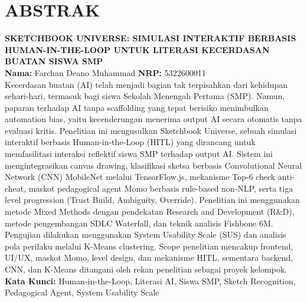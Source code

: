 \documentclass[12pt,a4paper,oneside,openany]{report}
\begin{document}
\chapter*{ABSTRAK}
\thispagestyle{empty}
\textbf{SKETCHBOOK UNIVERSE: SIMULASI INTERAKTIF BERBASIS HUMAN-IN-THE-LOOP UNTUK LITERASI KECERDASAN BUATAN SISWA SMP}\\[0.5cm]
\textbf{Nama:} Farchan Deano Muhammad \quad \textbf{NRP:} 5322600011\\[1cm]
Kecerdasan buatan (AI) telah menjadi bagian tak terpisahkan dari kehidupan sehari-hari, termasuk bagi siswa Sekolah Menengah Pertama (SMP). Namun, paparan terhadap AI tanpa scaffolding yang tepat berisiko menimbulkan automation bias, yaitu kecenderungan menerima output AI secara otomatis tanpa evaluasi kritis. Penelitian ini mengusulkan Sketchbook Universe, sebuah simulasi interaktif berbasis Human-in-the-Loop (HITL) yang dirancang untuk memfasilitasi interaksi reflektif siswa SMP terhadap output AI. Sistem ini mengintegrasikan canvas drawing, klasifikasi sketsa berbasis Convolutional Neural Network (CNN) MobileNet melalui TensorFlow.js, mekanisme Top-6 check anti-cheat, maskot pedagogical agent Momo berbasis rule-based non-NLP, serta tiga level progression (Trust Build, Ambiguity, Override). Penelitian ini menggunakan metode Mixed Methods dengan pendekatan Research and Development (R\&D), metode pengembangan SDLC Waterfall, dan teknik analisis Fishbone 6M. Pengujian dilakukan menggunakan System Usability Scale (SUS) dan analisis pola perilaku melalui K-Means clustering. Scope penelitian mencakup frontend, UI/UX, maskot Momo, level design, dan mekanisme HITL, sementara backend, CNN, dan K-Means ditangani oleh rekan penelitian sebagai proyek kelompok.\\[1cm]
\textbf{Kata Kunci:} Human-in-the-Loop, Literasi AI, Siswa SMP, Sketch Recognition, Pedagogical Agent, System Usability Scale
\newpage

\end{document}
